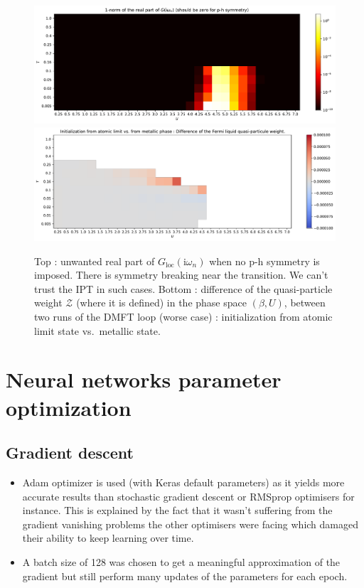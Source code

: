 \documentclass[reprint,amsmath,amssymb,aps,pra]{revtex4-2}
\newcommand{\iwn}{\mathrm{i}\omega_n}
\begin{document}
\begin{figure}
\includegraphics[width=\textwidth]{real-part-norm-increasingU.pdf}
\includegraphics[width=\textwidth]{diff-Zat-ZincU.pdf}
\caption{\label{fig:ph-diag-sanity-checks}Top : unwanted real part of $G_\text{loc}(\iwn)$ when no p-h symmetry is imposed. There is symmetry breaking near the transition. We can't trust the IPT in such cases. Bottom : difference of the quasi-particle weight $\mathcal{Z}$ (where it is defined) in the phase space $(\beta, U)$, between two runs of the DMFT loop (worse case) : initialization from atomic limit state vs.\ metallic state.}
\end{figure}

\section{Neural networks parameter optimization}

\subsection{Gradient descent\label{sec:nn:grad-desc}}

\begin{itemize}
    \item Adam optimizer is used (with Keras default parameters) as it yields more accurate results than stochastic gradient descent or RMSprop optimisers for instance. This is explained by the fact that it wasn't suffering from the gradient vanishing problems the other optimisers were facing which damaged their ability to keep learning over time.
    \item A batch size of 128 was chosen to get a meaningful approximation of the gradient but still perform many updates of the parameters for each epoch.
\end{itemize}
\end{document}
